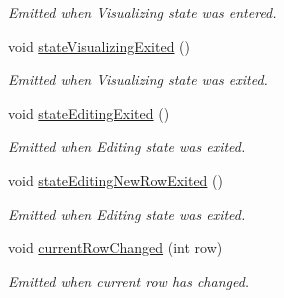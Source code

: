 \begin{DoxyCompactItemize}
\begin{DoxyCompactList}\small\item\em Emitted when Visualizing state was entered. \end{DoxyCompactList}\item 
\hypertarget{classmdt_abstract_sql_widget_a8f2eda6e219e49c972834a1e5c39e8ff}{
void \hyperlink{classmdt_abstract_sql_widget_a8f2eda6e219e49c972834a1e5c39e8ff}{stateVisualizingExited} ()}
\label{classmdt_abstract_sql_widget_a8f2eda6e219e49c972834a1e5c39e8ff}

\begin{DoxyCompactList}\small\item\em Emitted when Visualizing state was exited. \end{DoxyCompactList}\item 
\hypertarget{classmdt_abstract_sql_widget_a925485d7acc131d438f6ea251c9b1fb9}{
void \hyperlink{classmdt_abstract_sql_widget_a925485d7acc131d438f6ea251c9b1fb9}{stateEditingExited} ()}
\label{classmdt_abstract_sql_widget_a925485d7acc131d438f6ea251c9b1fb9}

\begin{DoxyCompactList}\small\item\em Emitted when Editing state was exited. \end{DoxyCompactList}\item 
\hypertarget{classmdt_abstract_sql_widget_af4ed2a005f55ffe23ce6382f1ed3f68e}{
void \hyperlink{classmdt_abstract_sql_widget_af4ed2a005f55ffe23ce6382f1ed3f68e}{stateEditingNewRowExited} ()}
\label{classmdt_abstract_sql_widget_af4ed2a005f55ffe23ce6382f1ed3f68e}

\begin{DoxyCompactList}\small\item\em Emitted when Editing state was exited. \end{DoxyCompactList}\item 
void \hyperlink{classmdt_abstract_sql_widget_a182972cd54cf7e00322c0b6973ecbde2}{currentRowChanged} (int row)
\begin{DoxyCompactList}\small\item\em Emitted when current row has changed. \end{DoxyCompactList}\end{DoxyCompactItemize}
